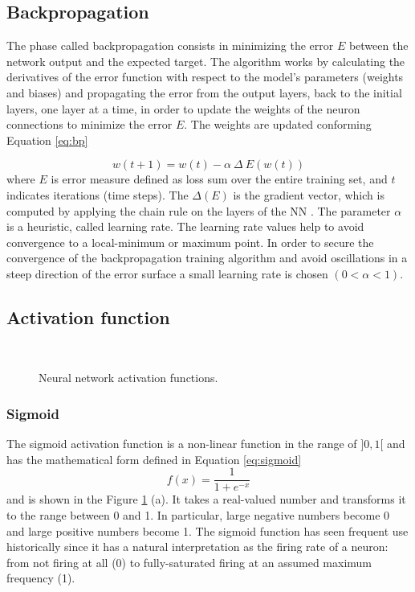 \subsection{Backpropagation}
The phase called backpropagation consists in minimizing the error $E$ between the network output and the expected target. The algorithm works by calculating the derivatives of the error
function with respect to the model’s parameters (weights and biases) and propagating the
error from the output layers, back to the initial layers, one layer at a time, in order to update the weights of the neuron connections to minimize the error $E$. The weights are updated conforming Equation \ref{eq:bp}

\begin{equation}
w(t+1) = w(t) - \alpha\ \Delta\ E(w(t))
\label{eq:bp}
\end{equation}
where $E$ is error measure defined as loss sum over the entire training set, and $t$ indicates iterations (time steps). The $\Delta(E)$ is the gradient vector, which is computed by applying the chain rule on the layers of the NN \cite{rumelhart1985learning}. The parameter $\alpha$ is a heuristic, called learning rate. The learning rate values help to avoid convergence to a local-minimum or maximum point. In order to secure the convergence of the backpropagation training algorithm and avoid oscillations in a steep direction of the error surface a small learning rate is chosen $(0 < \alpha < 1)$.

\subsection{Activation function}
\begin{figure}[!htb]
\centering
\hspace*{0.2in} %
\\
\hspace*{0.2in} %


\caption{Neural network activation functions. } \label{fig:activation}
\end{figure}
\subsubsection{Sigmoid}
The sigmoid activation function is a non-linear function in the range of $]0, 1[$ and has the mathematical form defined in Equation \ref{eq:sigmoid}
\begin{equation}
f(x) = \frac{1}{1+e^{-x}}
\label{eq:sigmoid}
\end{equation}
and is shown in the Figure \ref{fig:activation} (a). It takes a real-valued number and transforms it to the range between 0 and 1. In particular, large negative numbers become 0 and large positive numbers become 1. The sigmoid function has seen frequent use historically since it has a natural interpretation as the firing rate of a neuron: from not firing at all (0) to fully-saturated firing at an assumed maximum frequency (1). 


